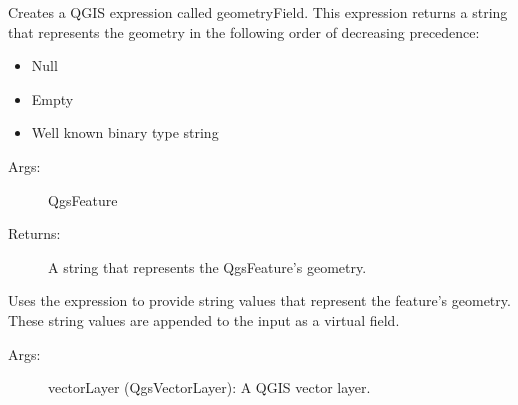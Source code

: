 \documentclass[letterpaper,10pt,english]{sphinxmanual}
\begin{document}
\begin{fulllineitems}
\label{\detokenize{API:parseQGISGeometry.geometryField}}
Creates a QGIS expression called geometryField.  This expression returns a string that represents the geometry in
the following order of decreasing precedence:
\begin{itemize}
\item {} 
Null

\item {} 
Empty

\item {} 
Well known binary type string

\end{itemize}
\begin{description}
\item[{Args:}] \leavevmode
QgsFeature

\item[{Returns:}] \leavevmode
A string that represents the QgsFeature’s geometry.

\end{description}

\end{fulllineitems}


\begin{fulllineitems}
\label{\detokenize{API:parseQGISGeometry.layerAddVirtualGeometryField}}
Uses the  expression to provide string values that represent the feature’s geometry.  These string
values are appended to the input  as a virtual field.
\begin{description}
\item[{Args:}] \leavevmode
vectorLayer (QgsVectorLayer):  A QGIS vector layer.

\end{description}

\end{fulllineitems}

\end{document}

